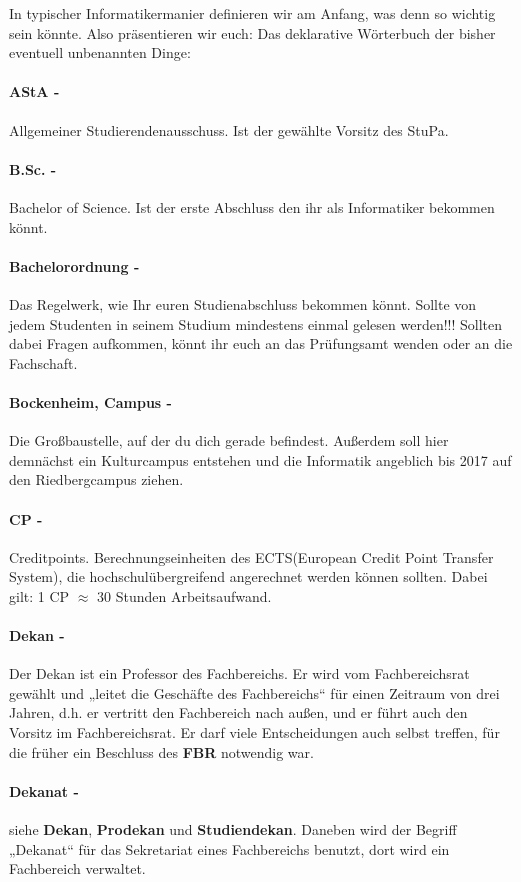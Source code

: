 In typischer Informatikermanier definieren wir am Anfang, was denn so wichtig sein k\"onnte. Also pr\"asentieren wir euch: Das deklarative W\"orterbuch der bisher eventuell unbenannten Dinge:
\spaltenanfang
\paragraph{AStA -} \glqq Allgemeiner Studierendenausschuss\grqq . Ist der gewählte Vorsitz des StuPa.
\paragraph{B.Sc. -}\glqq Bachelor of Science\grqq . Ist der erste Abschluss den ihr als Informatiker bekommen könnt.
\paragraph{Bachelorordnung -} Das Regelwerk, wie Ihr euren Studienabschluss bekommen könnt. Sollte von jedem Studenten in seinem Studium mindestens einmal gelesen werden!!! Sollten dabei Fragen aufkommen, könnt ihr euch an das Prüfungsamt wenden oder an die Fachschaft.
\paragraph{Bockenheim, Campus -} Die Großbaustelle, auf der du dich gerade befindest. Außerdem soll hier demnächst ein Kulturcampus entstehen und die Informatik angeblich bis 2017 auf den Riedbergcampus ziehen.
\paragraph{CP -} \glqq Creditpoints\grqq . Berechnungseinheiten des ECTS(European Credit Point Transfer System), die hochschulübergreifend angerechnet werden können sollten. Dabei gilt: 1 CP $\approx$ 30 Stunden Arbeitsaufwand.
\paragraph{Dekan -} Der Dekan ist ein Professor des Fachbereichs. Er wird vom Fachbereichsrat gewählt und „leitet die Geschäfte des Fachbereichs“ für einen Zeitraum von drei Jahren, d.h. er vertritt den Fachbereich nach außen, und er führt auch den Vorsitz im Fachbereichsrat. Er darf viele Entscheidungen auch selbst treffen, für die früher ein Beschluss des \textbf{FBR} notwendig war.
\paragraph{Dekanat -} siehe \textbf{Dekan}, \textbf{Prodekan} und \textbf{Studiendekan}. Daneben wird der Begriff „Dekanat“ für das Sekretariat eines Fachbereichs benutzt, dort wird ein Fachbereich verwaltet.
